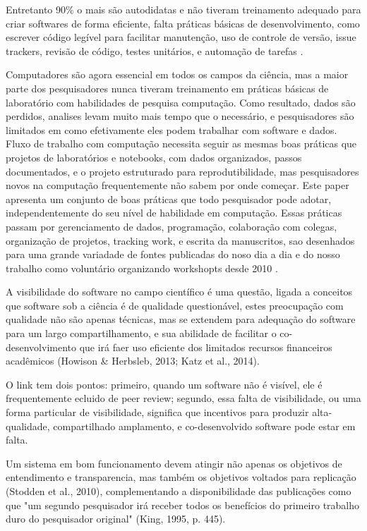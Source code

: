 Entretanto 90\% o mais são autodidatas e não tiveram
treinamento adequado para criar softwares de forma eficiente, falta
práticas básicas de desenvolvimento, como escrever código legível para
facilitar manutenção, uso de controle de versão, issue trackers, revisão de código,
testes unitários, e automação de tarefas \cite{wilson2014best}.

Computadores são agora essencial em todos os campos da ciência, mas a maior
parte dos pesquisadores nunca tiveram treinamento em práticas básicas de
laboratório com habilidades de pesquisa computação. Como resultado, dados são
perdidos, analises levam muito mais tempo que o necessário, e pesquisadores são
limitados em como efetivamente eles podem trabalhar com software e dados.
Fluxo de trabalho com computação necessita seguir as mesmas boas práticas que
projetos de laboratórios e notebooks, com dados organizados, passos
documentados, e o projeto estruturado para reprodutibilidade, mas pesquisadores
novos na computação frequentemente não sabem por onde começar. Este paper
apresenta um conjunto de boas práticas que todo pesquisador pode adotar,
independentemente do seu nível de habilidade em computação. Essas práticas
passam por gerenciamento de dados, programação, colaboração com colegas,
organização de projetos, tracking work, e escrita da manuscritos, sao
desenhados para uma grande variadade de fontes publicadas do noso dia a dia e
do nosso trabalho como voluntário organizando workshopts desde 2010
\cite{wilson2017good}.

A visibilidade do software no campo científico é uma questão, ligada
a conceitos que software sob a ciência é de qualidade questionável,
estes preocupação com qualidade não são apenas técnicas, mas se extendem para 
adequação do software para um largo compartilhamento, e sua abilidade de facilitar
o co-desenvolvimento que irá faer uso eficiente dos limitados recursos financeiros acadêmicos
(Howison \& Herbsleb, 2013; Katz et al., 2014).

O link tem dois pontos: primeiro, quando um software não é visível,
ele é frequentemente ecluido de peer review; segundo, essa falta de
visibilidade, ou uma forma particular de visibilidade, significa que
incentivos para produzir alta-qualidade, compartilhado amplamento, e
co-desenvolvido software pode estar em falta.

Um sistema em bom funcionamento devem atingir não apenas os objetivos
de entendimento e transparencia, mas também os objetivos voltados para replicação
(Stodden et al., 2010), complementando a disponibilidade das publicações como que
"um segundo pesquisador irá receber todos os benefícios do primeiro trabalho duro do pesquisador original"
(King, 1995, p. 445).

